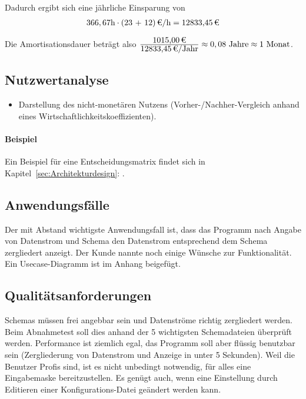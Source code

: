 Dadurch ergibt sich eine jährliche Einsparung von 
\begin{eqnarray}
366,67 \mbox{h} \cdot \eur{(23 + 12)}{\mbox{/h}} = \eur{12833,45}
\end{eqnarray}

Die Amortisationsdauer beträgt also $\frac{\eur{1015,00}}{\eur{12833,45}\mbox{/Jahr}} \approx 0,08 \mbox{ Jahre} \approx 1 \mbox{ Monat}$.


\subsection{Nutzwertanalyse}
\label{sec:Nutzwertanalyse}
\begin{itemize}
	\item Darstellung des nicht-monetären Nutzens (\zB Vorher-/Nachher-Vergleich anhand eines Wirtschaftlichkeitskoeffizienten). 
\end{itemize}

\paragraph{Beispiel}
Ein Beispiel für eine Entscheidungsmatrix findet sich in Kapitel~\ref{sec:Architekturdesign}: .


\subsection{Anwendungsfälle}
\label{sec:Anwendungsfaelle}
Der mit Abstand wichtigste Anwendungsfall ist, dass das Programm nach Angabe von Datenstrom und Schema den Datenstrom entsprechend dem Schema zergliedert anzeigt.
Der Kunde nannte noch einige Wünsche zur Funktionalität. Ein Usecase-Diagramm ist im Anhang beigefügt.


\subsection{Qualitätsanforderungen}
\label{sec:Qualitaetsanforderungen}
Schemas müssen frei angebbar sein und Datenströme richtig zergliedert werden.
Beim Abnahmetest soll dies anhand der 5 wichtigsten Schemadateien überprüft werden.
Performance ist ziemlich egal, das Programm soll aber flüssig benutzbar sein (Zergliederung von Datenstrom und Anzeige in unter 5 Sekunden).
Weil die Benutzer Profis sind, ist es nicht unbedingt notwendig, für alles eine Eingabemaske bereitzustellen. Es genügt auch, wenn eine Einstellung durch Editieren einer Konfigurations-Datei geändert werden kann.


